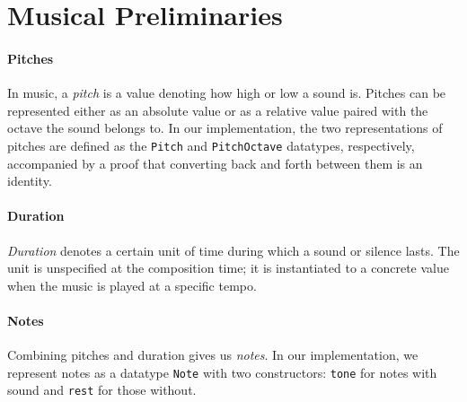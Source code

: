 \section{Musical Preliminaries}
\label{sec:music}

\paragraph{Pitches}
In music, a \emph{pitch} is a value denoting how high or low a sound is.
Pitches can be represented either as an absolute value or as a relative
value paired with the octave the sound belongs to.
In our implementation, the two representations of pitches are defined
as the \texttt{Pitch} and \texttt{PitchOctave} datatypes, respectively,
accompanied by a proof that converting back and forth between them
is an identity.




\paragraph{Duration}
\emph{Duration} denotes a certain unit of time during which a sound
or silence lasts.
The unit is unspecified at the composition time; it is instantiated to
a concrete value when the music is played at a specific tempo.


\paragraph{Notes}
Combining pitches and duration gives us \emph{notes}.
In our implementation, we represent notes as a datatype \texttt{Note}
with two constructors: \texttt{tone} for notes with sound and
\texttt{rest} for those without.


